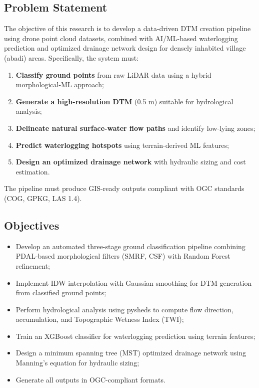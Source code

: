 \documentclass[a4paper,12pt]{article}
\begin{document}
\subsection{Problem Statement}

The objective of this research is to develop a data-driven DTM creation pipeline using drone point cloud datasets, combined with AI/ML-based waterlogging prediction and optimized drainage network design for densely inhabited village (abadi) areas. Specifically, the system must:

\begin{enumerate}[noitemsep]
	\item \textbf{Classify ground points} from raw LiDAR data using a hybrid morphological-ML approach;
	\item \textbf{Generate a high-resolution DTM} (0.5 m) suitable for hydrological analysis;
	\item \textbf{Delineate natural surface-water flow paths} and identify low-lying zones;
	\item \textbf{Predict waterlogging hotspots} using terrain-derived ML features;
	\item \textbf{Design an optimized drainage network} with hydraulic sizing and cost estimation.
\end{enumerate}

The pipeline must produce GIS-ready outputs compliant with OGC standards (COG, GPKG, LAS 1.4).

\subsection{Objectives}

\begin{itemize}
	\item Develop an automated three-stage ground classification pipeline combining PDAL-based morphological filters (SMRF, CSF) with Random Forest refinement;
	\item Implement IDW interpolation with Gaussian smoothing for DTM generation from classified ground points;
	\item Perform hydrological analysis using pysheds to compute flow direction, accumulation, and Topographic Wetness Index (TWI);
	\item Train an XGBoost classifier for waterlogging prediction using terrain features;
	\item Design a minimum spanning tree (MST) optimized drainage network using Manning's equation for hydraulic sizing;
	\item Generate all outputs in OGC-compliant formats.
\end{itemize}
\end{document}
